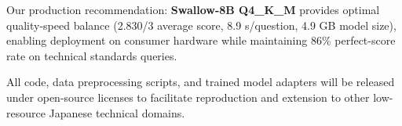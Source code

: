 \documentclass[twocolumn]{article}
\begin{document}
Our production recommendation: \textbf{Swallow-8B Q4\_K\_M} provides optimal quality-speed
balance (2.830/3 average score, 8.9 s/question, 4.9 GB model size), enabling deployment
on consumer hardware while maintaining 86\% perfect-score rate on technical standards queries.

All code, data preprocessing scripts, and trained model adapters will be released under
open-source licenses to facilitate reproduction and extension to other low-resource
Japanese technical domains.




\end{document}
